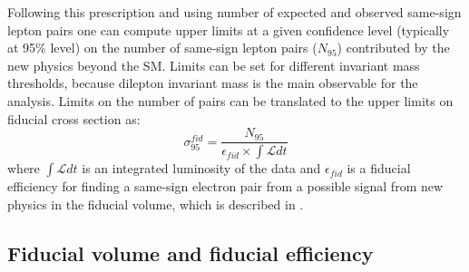 Following this prescription and using number of expected and observed same-sign lepton pairs one can compute 
upper limits at a given confidence level (typically at 95$\%$ level) on the number of same-sign lepton pairs ($N_{95}$)
contributed by the new physics beyond the SM. Limits can be set for different invariant mass thresholds, 
because dilepton invariant mass is the main observable for the analysis.
Limits on the number of pairs can be translated to the upper limits on fiducial cross section as:
\begin{equation}
 \sigma_{95}^{fid} = \dfrac{N_{95}}{\epsilon_{fid} \times \int \mathscr{L} dt}
 \label{eq:fid_cross_section}
\end{equation}
where $\int \mathscr{L} dt$ is an integrated luminosity of the data and $\epsilon_{fid}$ is a fiducial efficiency for finding a same-sign electron pair from
a possible signal from new physics in the fiducial volume, which is described in .


\subsection{Fiducial volume and fiducial efficiency}
\label{subsec:fid_volume_eff}

